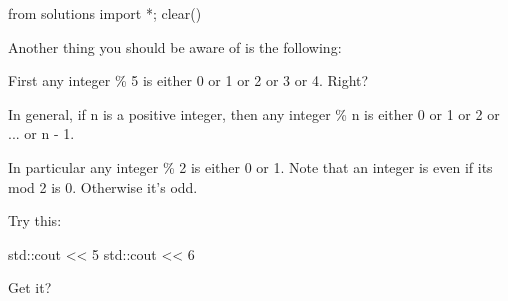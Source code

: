 \begin{python0}
from solutions import *; clear()
\end{python0}

Another thing you should be aware of is the following:

First any integer \% 5 is either 0 or 1 or 2 or 3 or 4. Right?

In general, if n is a positive integer, then any integer \% n is either 0 or 1
or 2 or ... or n - 1.

In particular any integer \% 2 is either 0 or 1. Note that an integer is even
if its mod 2 is 0. Otherwise it's odd.

Try this:
\begin{console}
std::cout << 5 %
std::cout << 6 %
\end{console}

Get it?

